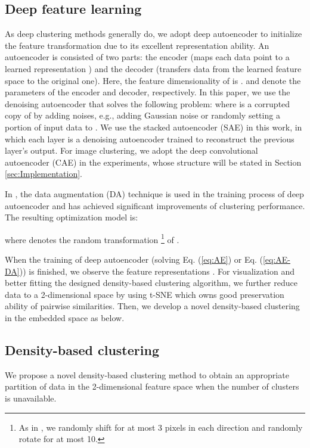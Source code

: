 \documentclass[10pt,twocolumn,letterpaper]{article}
\begin{document}
\subsection{Deep feature learning}
\label{sec:FeatureLearning}
As deep clustering methods generally do, we adopt deep autoencoder to initialize the feature transformation due to its excellent representation ability.
An autoencoder is consisted of two parts: the encoder  (maps each data point  to a learned representation ) and the decoder  (transfers data from the learned feature space to the original one). Here, the feature dimensionality of  is .  and  denote the parameters of the encoder and decoder, respectively.
In this paper, we use the denoising autoencoder \cite{vincent2008} that solves the following problem: 
where  is a corrupted copy of  by adding noises, e.g., adding Gaussian noise or randomly setting a portion of input data to . 
We use the stacked autoencoder (SAE) \cite{vincent2010stacked} in this work, in which each layer is a denoising autoencoder trained to reconstruct the previous layer's output.
For image clustering, we adopt the deep convolutional autoencoder (CAE) in the experiments, whose structure will be stated in Section \ref{sec:Implementation}.



In \cite{Guo2018DEC-DA}, the data augmentation (DA) technique is used in the training process of deep autoencoder and has achieved significant improvements of clustering performance. The resulting optimization model is:

where  denotes the random transformation \footnote{As in \cite{Guo2018DEC-DA}, we randomly shift for at most 3 pixels in each direction and randomly rotate for at most 10.} of . 



When the training of deep autoencoder (solving Eq. (\ref{eq:AE}) or Eq. (\ref{eq:AE-DA})) is finished, we observe the feature representations . For visualization and better fitting the designed density-based clustering algorithm, we further reduce data  to a 2-dimensional space  by using t-SNE \cite{maaten2008tSNE} which owns good preservation ability of pairwise similarities. 
Then, we develop a novel density-based clustering in the embedded space  as below. 

\subsection{Density-based clustering}
\label{sec:density-based}
We propose a novel density-based clustering method to obtain an appropriate partition of data  in the 2-dimensional feature space when the number of clusters is unavailable. 
\end{document}
